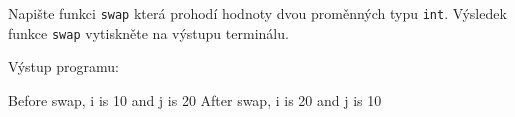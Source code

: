 \begin{mdframed}[style=mdexam]
  \begin{example}\label{cpp:exam010}
    Napište funkci \texttt{swap} která prohodí hodnoty dvou proměnných typu \texttt{int}. Výsledek
    funkce \texttt{swap} vytiskněte na výstupu terminálu.
    
    Výstup programu:
      \begin{mdframed}[style=mdmsdos]
        Before swap, i is 10 and j is 20 \newline        
        After swap, i is 20 and j is 10
      \end{mdframed}
\end{example}
\end{mdframed}